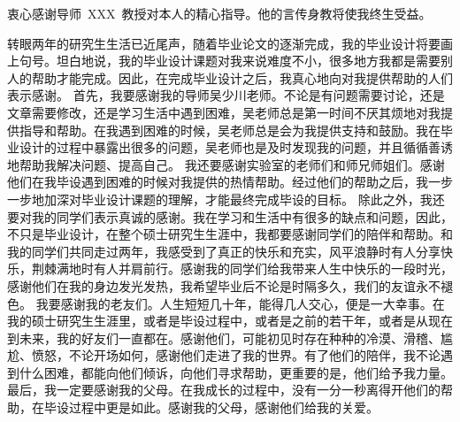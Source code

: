 \begin{acknowledgements}
衷心感谢导师~XXX~教授对本人的精心指导。他的言传身教将使我终生受益。

转眼两年的研究生生活已近尾声，随着毕业论文的逐渐完成，我的毕业设计将要画上句号。坦白地说，我的毕业设计课题对我来说难度不小，很多地方我都是需要别人的帮助才能完成。因此，在完成毕业设计之后，我真心地向对我提供帮助的人们表示感谢。
首先，我要感谢我的导师吴少川老师。不论是有问题需要讨论，还是文章需要修改，还是学习生活中遇到困难，吴老师总是第一时间不厌其烦地对我提供指导和帮助。在我遇到困难的时候，吴老师总是会为我提供支持和鼓励。我在毕业设计的过程中暴露出很多的问题，吴老师也是及时发现我的问题，并且循循善诱地帮助我解决问题、提高自己。
我还要感谢实验室的老师们和师兄师姐们。感谢他们在我毕设遇到困难的时候对我提供的热情帮助。经过他们的帮助之后，我一步一步地加深对毕业设计课题的理解，才能最终完成毕设的目标。
除此之外，我还要对我的同学们表示真诚的感谢。我在学习和生活中有很多的缺点和问题，因此，不只是毕业设计，在整个硕士研究生生涯中，我都要感谢同学们的陪伴和帮助。和我的同学们共同走过两年，我感受到了真正的快乐和充实，风平浪静时有人分享快乐，荆棘满地时有人并肩前行。感谢我的同学们给我带来人生中快乐的一段时光，感谢他们在我的身边发光发热，我希望毕业后不论是时隔多久，我们的友谊永不褪色。
我要感谢我的老友们。人生短短几十年，能得几人交心，便是一大幸事。在我的硕士研究生生涯里，或者是毕设过程中，或者是之前的若干年，或者是从现在到未来，我的好友们一直都在。感谢他们，可能初见时存在种种的冷漠、滑稽、尴尬、愤怒，不论开场如何，感谢他们走进了我的世界。有了他们的陪伴，我不论遇到什么困难，都能向他们倾诉，向他们寻求帮助，更重要的是，他们给予我力量。
最后，我一定要感谢我的父母。在我成长的过程中，没有一分一秒离得开他们的帮助，在毕设过程中更是如此。感谢我的父母，感谢他们给我的关爱。

\end{acknowledgements}
